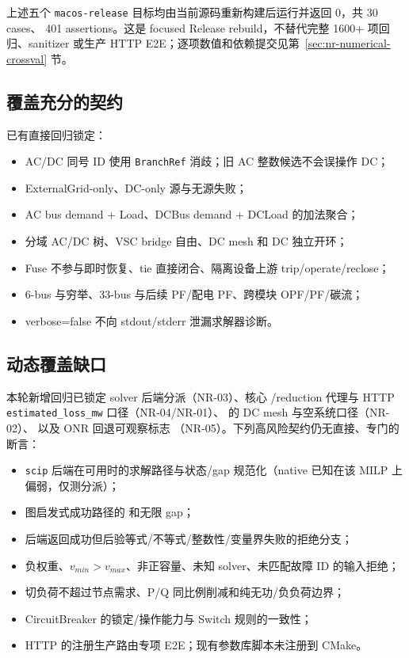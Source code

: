 上述五个 \texttt{macos-release} 目标均由当前源码重新构建后运行并返回 0，共 30 cases、
401 assertions。这是 focused Release rebuild，不替代完整 1600+ 项回归、sanitizer 或生产 HTTP
E2E；逐项数值和依赖提交见第~\ref{sec:nr-numerical-crossval} 节。

\subsection{覆盖充分的契约}

已有直接回归锁定：
\begin{itemize}
  \item AC/DC 同号 ID 使用 \texttt{BranchRef} 消歧；旧 AC 整数候选不会误操作 DC；
  \item ExternalGrid-only、DC-only 源与无源失败；
  \item AC bus demand + Load、DCBus demand + DCLoad 的加法聚合；
  \item 分域 AC/DC 树、VSC bridge 自由、DC mesh 和 DC 独立开环；
  \item Fuse 不参与即时恢复、tie 直接闭合、隔离设备上游 trip/operate/reclose；
  \item 6-bus 与穷举、33-bus 与后续 PF/配电 PF、跨模块 OPF/PF/碳流；
  \item verbose=false 不向 stdout/stderr 泄漏求解器诊断。
\end{itemize}

\subsection{动态覆盖缺口}

本轮新增回归已锁定 solver 后端分派（NR-03）、核心 /reduction 代理与 HTTP
\texttt{estimated\_loss\_mw} 口径（NR-04/NR-01）、 的 DC mesh 与空系统口径（NR-02）、
以及 ONR 回退可观察标志 （NR-05）。下列高风险契约仍无直接、专门的断言：
\begin{itemize}
  \item \texttt{scip} 后端在可用时的求解路径与状态/gap 规范化（native 已知在该 MILP 上偏弱，仅测分派）；
  \item 图启发式成功路径的  和无限 gap；
  \item 后端返回成功但后验等式/不等式/整数性/变量界失败的拒绝分支；
  \item 负权重、$v_{min}>v_{max}$、非正容量、未知 solver、未匹配故障 ID 的输入拒绝；
  \item 切负荷不超过节点需求、P/Q 同比例削减和纯无功/负负荷边界；
  \item CircuitBreaker 的锁定/操作能力与 Switch 规则的一致性；
  \item HTTP  的注册生产路由专项 E2E；现有参数库脚本未注册到 CMake。
\end{itemize}

